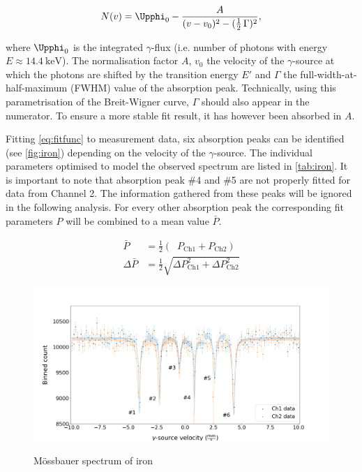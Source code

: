 \begin{equation}
\label{eq:fitfunc}
N(v) = \Upphi_0 - \frac{A}{(v-v_0)^2 - (\frac{1}{2}\,\Gamma)^2},
\end{equation}

where $\Upphi_0$ is the integrated $\gamma$-flux (i.e. number of photons with energy
$E\approx\SI{14.4}{\kilo\electronvolt}$). The normalisation factor $A$, $v_0$ the
velocity of the $\gamma$-source at which the photons are shifted by the transition
energy $E'$ and $\Gamma$ the full-width-at-half-maximum (FWHM) value of the
absorption peak. Technically, using this parametrisation of the Breit-Wigner curve,
$\Gamma$ should also appear in the numerator. To ensure a more stable fit result,
it has however been absorbed in $A$.

Fitting \autoref{eq:fitfunc} to measurement data, six absorption peaks can be
identified (see \autoref{fig:iron}) depending on the velocity of the $\gamma$-source.
The individual parameters optimised to model the observed spectrum are listed in
\autoref{tab:iron}. It is important to note that absorption peak \#4 and \#5 are not
properly fitted for data from Channel 2. The information gathered from these peaks
will be ignored in the following analysis. For every other absorption peak the
corresponding fit parameters $P$ will be combined to a mean value $\bar{P}$.



\begin{align*}
	\bar{P} &= \frac{1}{2}\left(\;\;P_\text{Ch1} + P_\text{Ch2}\right) \\[0.5cm]
	\Delta\bar{P} &= \frac{1}{2}\sqrt{\Delta P_\text{Ch1}^2+\Delta P_\text{Ch2}^2}
\end{align*}

\begin{figure}
	\includegraphics[width=1.0\textwidth]{./fig/Iron.png}
	\caption{Mössbauer spectrum of iron}{}\label{fig:iron}
\end{figure}

